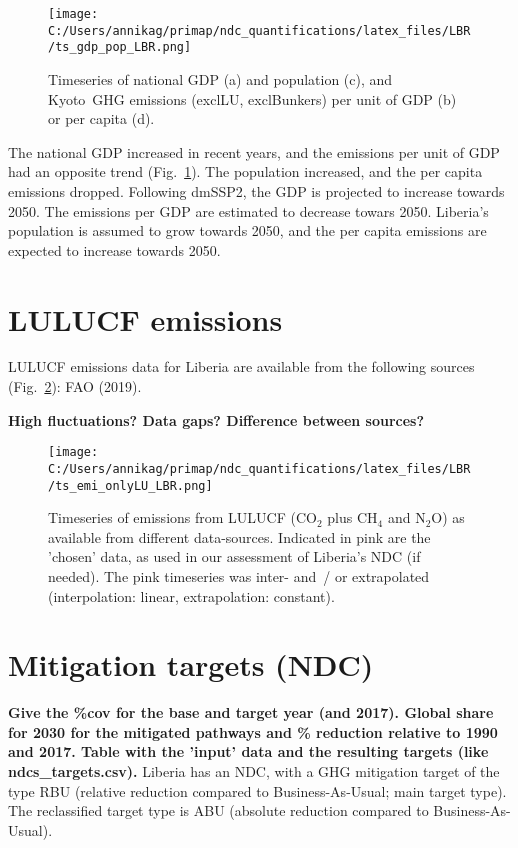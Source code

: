 \documentclass[12pt]{article}
\begin{document}
 \begin{figure}[H]
 \centering
 \texttt{[image: C:/Users/annikag/primap/ndc\_quantifications/latex\_files/LBR/ts\_gdp\_pop\_LBR.png]}
 \caption{Timeseries of national GDP (a) and population (c), and Kyoto~GHG emissions (exclLU, exclBunkers) per unit of GDP (b) or per capita (d).}
 \label{fig:tsSocioEco}
 \end{figure}

 The national GDP increased in recent years, and the emissions per unit of GDP had an opposite trend (Fig.~\ref{fig:tsSocioEco}).
 The population increased, and the per capita emissions dropped. 
 Following dmSSP2, the GDP is projected to increase towards 2050. 
 The emissions per GDP are estimated to decrease towars 2050. 
 Liberia's population is assumed to grow towards 2050, and the per capita emissions are expected to increase towards 2050. 

 \newpage %
 \section{LULUCF emissions}
 \label{sec:emiLULUCF}
 LULUCF emissions data for Liberia are available from the following sources (Fig.~\ref{fig:tsLULUCF}): FAO (2019).

 \textbf{High fluctuations? Data gaps? Difference between sources?}

 \begin{figure}[H]
 \centering
 \texttt{[image: C:/Users/annikag/primap/ndc\_quantifications/latex\_files/LBR/ts\_emi\_onlyLU\_LBR.png]}
 \caption{Timeseries of emissions from LULUCF (CO$_2$ plus CH$_4$ and N$_2$O) as available from different data-sources. 
 Indicated in pink are the 'chosen' data, as used in our assessment of Liberia's NDC (if needed). 
 The pink timeseries was inter- and~/ or extrapolated (interpolation: linear, extrapolation: constant).}
 \label{fig:tsLULUCF}
 \end{figure}

 \newpage %
 \section{Mitigation targets (NDC)}
 \label{sec:mitiTars}

 \textbf{ 
 Give the \%cov for the base and target year (and 2017).
 Global share for 2030 for the mitigated pathways and \% reduction relative to 1990 and 2017.
 Table with the 'input' data and the resulting targets (like ndcs\_targets.csv).}
 Liberia has an NDC, with a GHG mitigation target of the type RBU (relative reduction compared to Business-As-Usual; main target type).
 The reclassified target type is ABU (absolute reduction compared to Business-As-Usual).
\end{document}
